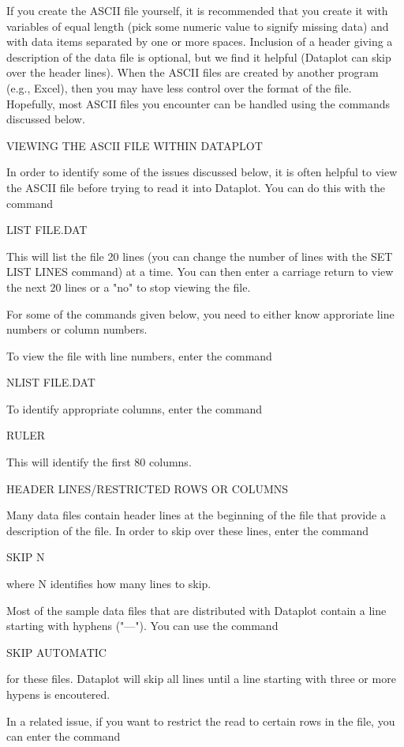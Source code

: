 If you create the ASCII file yourself, it is recommended that
you create it with variables of equal length (pick some numeric
value to signify missing data) and with data items separated by one
or more spaces.  Inclusion of a header giving a description of
the data file is optional, but we find it helpful (Dataplot
can skip over the header lines).  When the ASCII files are created
by another program (e.g., Excel), then you may have less control
over the format of the file.  Hopefully, most ASCII files you
encounter can be handled using the commands discussed below.


VIEWING THE ASCII FILE WITHIN DATAPLOT

In order to identify some of the issues discussed below, it is
often helpful to view the ASCII file before trying to read it into
Dataplot.  You can do this with the command

    LIST FILE.DAT

This will list the file 20 lines (you can change the number
of lines with the SET LIST LINES command) at a time.  You
can then enter a carriage return to view the next 20 lines or
a "no" to stop viewing the file.

For some of the commands given below, you need to either know
approriate line numbers or column numbers.

To view the file with line numbers, enter the command

   NLIST  FILE.DAT

To identify appropriate columns, enter the command

   RULER

This will identify the first 80 columns.


HEADER LINES/RESTRICTED ROWS OR COLUMNS

Many data files contain header lines at the beginning of the
file that provide a description of the file.  In order to
skip over these lines, enter the command

    SKIP N

where N identifies how many lines to skip.

Most of the sample data files that are distributed with Dataplot
contain a line starting with hyphens ("---").  You can use the
command 

    SKIP AUTOMATIC

for these files.  Dataplot will skip all lines until a line
starting with three or more hypens is encoutered.
 
In a related issue, if you want to restrict the read to certain
rows in the file, you can enter the command

